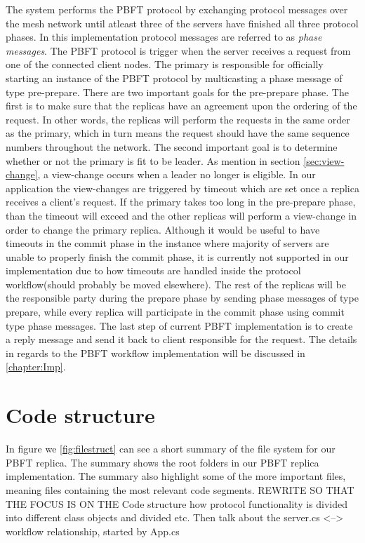 The system performs the PBFT protocol by exchanging protocol messages over the mesh network until atleast three of the servers have finished all three protocol phases. In this implementation protocol messages are referred to as \emph{phase messages}. The PBFT protocol is trigger when the server receives a request from one of the connected client nodes. The primary is responsible for officially starting an instance of the PBFT protocol by multicasting a phase message of type pre-prepare. There are two important goals for the pre-prepare phase. The first is to make sure that the replicas have an agreement upon the ordering of the request. In other words, the replicas will perform the requests in the same order as the primary, which in turn means the request should have the same sequence numbers throughout the network. The second important goal is to determine whether or not the primary is fit to be leader. As mention in section \autoref{sec:view-change}, a view-change occurs when a leader no longer is eligible. In our application the view-changes are triggered by timeout which are set once a replica receives a client's request. If the primary takes too long in the pre-prepare phase, than the timeout will exceed and the other replicas will perform a view-change in order to change the primary replica. Although it would be useful to have timeouts in the commit phase in the instance where majority of servers are unable to properly finish the commit phase, it is currently not supported in our implementation due to how timeouts are handled inside the protocol workflow(should probably be moved elsewhere). The rest of the replicas will be the responsible party during the prepare phase by sending phase messages of type prepare, while every replica will participate in the commit phase using commit type phase messages. The last step of current PBFT implementation is to create a reply message and send it back to client responsible for the request. The details in regards to the PBFT workflow implementation will be discussed in \autoref{chapter:Imp}.

\section{Code structure}
In figure we \autoref{fig:filestruct} can see a short summary of the file system for our PBFT replica. The summary shows the root folders in our PBFT replica implementation. The summary also highlight some of the more important files, meaning files containing the most relevant code segments. 
REWRITE SO THAT THE FOCUS IS ON THE Code structure how protocol functionality is divided into different class objects and divided etc. Then talk about the server.cs <--> workflow relationship, started by App.cs
